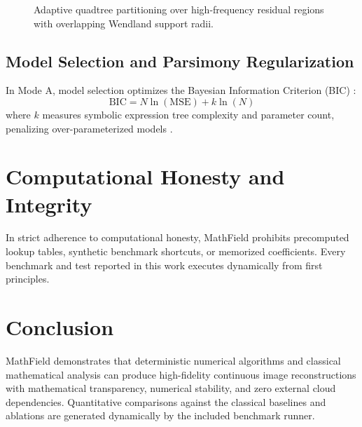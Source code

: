 \documentclass[11pt,a4paper]{article}
\begin{document}
\begin{figure}[htbp]
\centering
{}
\caption{Adaptive quadtree partitioning over high-frequency residual regions with overlapping Wendland support radii.}
\label{fig:quadtree}
\end{figure}

\subsection{Model Selection and Parsimony Regularization}
In Mode A, model selection optimizes the Bayesian Information Criterion (BIC) \cite{schwarz1978estimating}:
\begin{equation}
\text{BIC} = N \ln(\text{MSE}) + k \ln(N)
\end{equation}
where $k$ measures symbolic expression tree complexity and parameter count, penalizing over-parameterized models \cite{koza1992genetic}.

\section{Computational Honesty and Integrity}
In strict adherence to computational honesty, MathField prohibits precomputed lookup tables, synthetic benchmark shortcuts, or memorized coefficients. Every benchmark and test reported in this work executes dynamically from first principles.

\section{Conclusion}
MathField demonstrates that deterministic numerical algorithms and classical mathematical analysis can produce high-fidelity continuous image reconstructions with mathematical transparency, numerical stability, and zero external cloud dependencies. Quantitative comparisons against the classical baselines and ablations are generated dynamically by the included benchmark runner.



\end{document}
